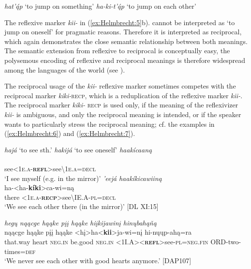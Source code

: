 \documentclass[output=paper]{langscibook}
\begin{document}
\ea  \label{ex:Helmbrecht:5}  
	\ea \textit{  hat'\'{ą}p  }  {}`to jump on something'
	\ex \textit{ha-ki-t'\'{ą}p  } {}`to jump on each other'
 \z 
\z

The reflexive marker \textit{kii-} in (\ref{ex:Helmbrecht:5}b). cannot be interpreted as `to jump on oneself' for pragmatic reasons. Therefore it is interpreted as reciprocal, which again demonstrates the close semantic relationship between both meanings. The semantic extension from reflexive to reciprocal is conceptually easy, the polysemous encoding of reflexive and reciprocal meanings is therefore widespread among the languages of the world (see \citealt{Maslova2013}).

The reciprocal usage of the \textit{kii-} reflexive marker sometimes competes with the reciprocal marker \textit{kiki-}\textsc{recp}, which is a reduplication of the reflexive marker \textit{kii-}. The reciprocal marker \textit{kiki-} \textsc{recp} is used only, if the meaning of the reflexivizer \textit{kii-} is ambiguous, and only the reciprocal meaning is intended, or if the speaker wants to particularly stress the reciprocal meaning; cf. the examples in (\ref{ex:Helmbrecht:6}) and (\ref{ex:Helmbrecht:7}).

\ea   \label{ex:Helmbrecht:6}
 \ea \textit{ hajá } {}`to see sth.'
 \ex \textit{  hakijá } {}`to see oneself'
 \ex  \textit{ 	 haakícaaną } \\
	\\
 {see<\textsc{1e.a}-\textbf{\textsc{\textsc{refl}}}>see{\textbackslash}\textsc{1e.a=decl}}\\
 \glt {}`I see myself (e.g. in the mirror)' 
 \ex  \textit{  'eejá haakíkicawiiną } \\  
	   {ha-<ha-\textbf{kíki}>ca-wi=ną}\\
  {there}  {<\textsc{1e.a}-\textbf{\textsc{recp}}>see{\textbackslash}\textsc{IE.A-\textsc{pl}=decl}}\\
	\glt `We see each other there (in the mirror)' [DL XI:15]
 \z
\z


\ea \textit{hegų nąącge hąąke pįį hąąke hiįkijawinį hinųbahąňą} \label{ex:Helmbrecht:7}\\ 	
  {nąącge}  {hąąke}  {pįį}   {hąąke}   {<hį>ha<\textbf{kii}>ja-wi=nį} {hi-nųųp-ahą=ra}\\
  {that.way} {heart} {\textsc{neg.in}} {be.good} {\textsc{neg.in}} {<\textsc{1I.A}><\textbf{\textsc{\textsc{refl}}}>see-\textsc{\textsc{pl}}=\textsc{neg.fin}} {\textsc{ORD}-two-times=\textsc{def}}\\
 \glt `We never see each other with good hearts anymore.' [DAP107]
\z 
\end{document}
